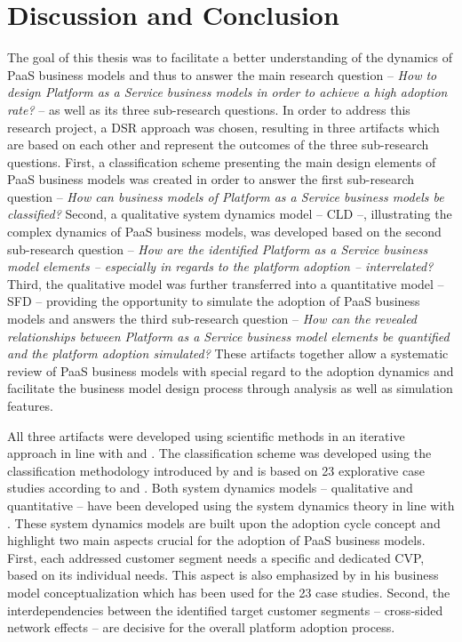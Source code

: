 \chapter{Discussion and Conclusion}\label{ch:dc}

The goal of this thesis was to facilitate a better understanding of the dynamics of \acf{PaaS} business models and thus to answer the main research question -- \textit{How to design Platform as a Service business models in order to achieve a high adoption rate?} -- as well as its three sub-research questions. In order to address this research project, a \acf{DSR} approach was chosen, resulting in three artifacts which are based on each other and represent the outcomes of the three sub-research questions. First, a classification scheme presenting the main design elements of \ac{PaaS} business models was created in order to answer the first sub-research question -- \textit{How can business models of Platform as a Service business models be classified?} Second, a qualitative system dynamics model -- \acf{CLD} --, illustrating the complex dynamics of \ac{PaaS} business models, was developed based on the second sub-research question -- \textit{How are the identified Platform as a Service business model elements -- especially in regards to the platform adoption -- interrelated?} Third, the qualitative model was further transferred into a quantitative model -- \acf{SFD} -- providing the opportunity to simulate the adoption of \ac{PaaS} business models and answers the third sub-research question -- \textit{How can the revealed relationships between Platform as a Service business model elements be quantified and the platform adoption simulated?} These artifacts together allow a systematic review of \ac{PaaS} business models with special regard to the adoption dynamics and facilitate the business model design process through analysis as well as simulation features. 

All three artifacts were developed using scientific methods in an iterative approach in line with \citet{Hevner2007} and \citet{Peffers2007}. The classification scheme was developed using the classification methodology introduced by \citet{Fettke2003} and is based on 23 explorative case studies according to \citet{Eisenhardt1989} and \citet{Yin2008}. Both system dynamics models -- qualitative and quantitative -- have been developed using the system dynamics theory in line with \citet{Sterman2000,Sterman2001}. These system dynamics models are built upon the adoption cycle concept \citep{Sterman2001} and highlight two main aspects crucial for the adoption of \ac{PaaS} business models. First, each addressed customer segment needs a specific and dedicated \acf{CVP}, based on its individual needs. This aspect is also emphasized by \citet{Johnson2008} in his business model conceptualization which has been used for the 23 case studies. Second, the interdependencies between the identified target customer segments -- cross-sided network effects -- are decisive for the overall platform adoption process.

